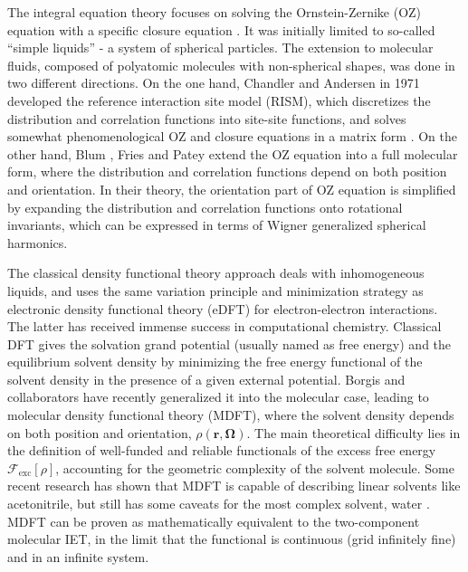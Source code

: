 The integral equation theory focuses on solving the Ornstein-Zernike
(\acs{OZ}) equation with a specific closure equation \citep{Hensen-McDonald,Gray-Gubbins}.
It was initially limited to so-called ``simple liquids'' - a system
of spherical particles. The extension to molecular fluids, composed
of polyatomic molecules with non-spherical shapes, was done in two
different directions. On the one hand, Chandler and Andersen in 1971
\citep{Chandler_1972_RISM} developed the reference interaction site
model (RISM), which discretizes the distribution and correlation functions
into site-site functions, and solves somewhat phenomenological \acs{OZ}
and closure equations in a matrix form \citep{hirata_molecular_2004}.
On the other hand, Blum \citep{Blum_I,Blum_II,blum_III}, Fries and
Patey \citep{Fries_Patey_1985} extend the \acs{OZ} equation into
a full molecular form, where the distribution and correlation functions
depend on both position and orientation. In their theory, the orientation
part of \acs{OZ} equation is simplified by expanding the distribution
and correlation functions onto rotational invariants, which can be
expressed in terms of Wigner generalized spherical harmonics.

The classical density functional theory approach deals with inhomogeneous
liquids, and uses the same variation principle and minimization strategy
\citep{mermin_thermal_1965,Evans_1979,Hansen_1987} as electronic
density functional theory (e\acs{DFT}) for electron-electron interactions.
The latter has received immense success in computational chemistry.
Classical \acs{DFT} gives the solvation grand potential (usually
named as free energy) and the equilibrium solvent density by minimizing
the free energy functional of the solvent density in the presence
of a given external potential. Borgis and collaborators \citep{gendre_classical_2009,jeanmairet_molecular_2013-1,jeanmairet_molecular_2015,jeanmairet_molecular_2016,Jeanmairet_thesis,levesque_solvation_2012,ramirez_density_2002,ramirez_density_2005,sergiievskyi_fast_2014,Zhao_2011}
have recently generalized it into the molecular case, leading to molecular
density functional theory (\acs{MDFT}), where the solvent density
depends on both position and orientation, $\rho(\mathbf{r},\mathbf{\Omega})$.
The main theoretical difficulty lies in the definition of well-funded
and reliable functionals of the excess free energy $\mathcal{F}_{\mathrm{exc}}\left[\rho\right]$,
accounting for the geometric complexity of the solvent molecule. Some
recent research has shown that \acs{MDFT} is capable of describing
linear solvents like acetonitrile, but still has some caveats for
the most complex solvent, water \citep{Zhao_2011}. \acs{MDFT} can
be proven as mathematically equivalent to the two-component molecular
\acs{IET}, in the limit that the functional is continuous (grid infinitely
fine) and in an infinite system.

